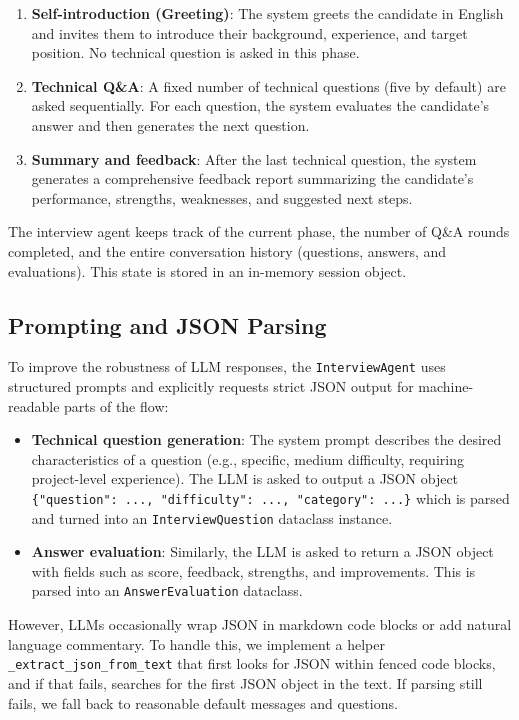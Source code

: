 \documentclass[11pt,a4paper]{article}
\begin{document}
\begin{enumerate}
    \item \textbf{Self-introduction (Greeting)}: The system greets the candidate in English and invites them to introduce their background, experience, and target position. No technical question is asked in this phase.
    \item \textbf{Technical Q\&A}: A fixed number of technical questions (five by default) are asked sequentially. For each question, the system evaluates the candidate's answer and then generates the next question.
    \item \textbf{Summary and feedback}: After the last technical question, the system generates a comprehensive feedback report summarizing the candidate's performance, strengths, weaknesses, and suggested next steps.
\end{enumerate}

The interview agent keeps track of the current phase, the number of Q\&A rounds completed, and the entire conversation history (questions, answers, and evaluations). This state is stored in an in-memory session object.

\subsection{Prompting and JSON Parsing}

To improve the robustness of LLM responses, the \texttt{InterviewAgent} uses structured prompts and explicitly requests strict JSON output for machine-readable parts of the flow:

\begin{itemize}
    \item \textbf{Technical question generation}: The system prompt describes the desired characteristics of a question (e.g., specific, medium difficulty, requiring project-level experience). The LLM is asked to output a JSON object \texttt{\{"question": ..., "difficulty": ..., "category": ...\}} which is parsed and turned into an \texttt{InterviewQuestion} dataclass instance.
    \item \textbf{Answer evaluation}: Similarly, the LLM is asked to return a JSON object with fields such as score, feedback, strengths, and improvements. This is parsed into an \texttt{AnswerEvaluation} dataclass.
\end{itemize}

However, LLMs occasionally wrap JSON in markdown code blocks or add natural language commentary. To handle this, we implement a helper \texttt{\_extract\_json\_from\_text} that first looks for JSON within fenced code blocks, and if that fails, searches for the first JSON object in the text. If parsing still fails, we fall back to reasonable default messages and questions.
\end{document}
